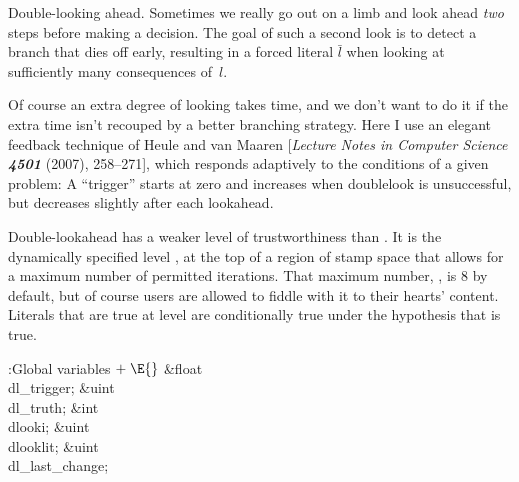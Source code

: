 Double-looking ahead. Sometimes we really go out on a limb and
look ahead {\it two\/} steps before making a decision. The goal of such a
second look is to detect a branch that dies off early, resulting
in a forced literal $\bar l$ when looking at sufficiently many consequences
of~$l$.

Of course an extra degree of looking takes time, and we don't want to
do it if the extra time isn't recouped by a better branching strategy.
Here I use an elegant feedback technique of Heule and van Maaren
[{\sl Lecture Notes in Computer Science\/ \bf4501} (2007), 258--271],
which responds adaptively to the conditions of a given problem:
A ``trigger'' starts at zero and increases when doublelook is unsuccessful,
but decreases slightly after each lookahead.

Double-lookahead has a weaker level of trustworthiness than
. It is the dynamically specified level , at the
top of a region of stamp space that allows for a maximum number of
permitted iterations. That maximum number, , is 8 by
default,
but of course users are allowed to fiddle with it to their hearts' content.
Literals that are true at level  are conditionally true under
the
hypothesis that  is true.

\Y\B\4:Global variables\X${}\mathrel+\E{}$\6
\&{float} \\{dl\_trigger};\6
\&{uint} \\{dl\_truth};\6
\&{int} \\{dlooki};\6
\&{uint} \\{dlooklit};\6
\&{uint} \\{dl\_last\_change};\par
\fi

